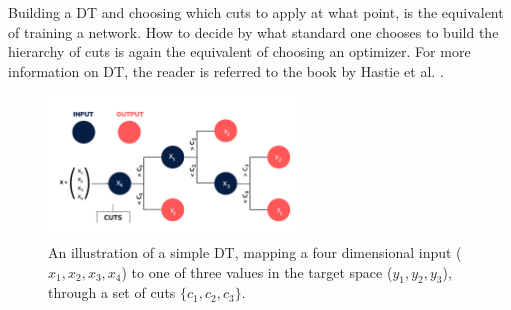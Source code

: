Building a \ac{DT} and choosing which cuts to apply at what point, is the equivalent of training a 
network. How to decide by what standard one chooses to build the hierarchy of cuts is again the 
equivalent of choosing an optimizer. For more information on \ac{DT}, the reader is referred to the 
book by Hastie et al. \cite{huang_introduction_2014}.
\begin{figure}[H]
    \centering
    \includegraphics[width=0.6\textwidth]{Figures/Illustrations/DT.png}
    \caption{An illustration of a simple \acs{DT}, mapping a four dimensional input ($x_1,x_2,x_3,x_4$) 
    to one of three values in the target space ($y_1,y_2,y_3$), through a set of cuts $\{c_1, c_2,c_{3}\}$.}
    \label{fig:DT}
\end{figure}
